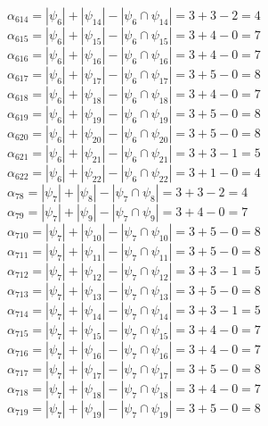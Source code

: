 \documentclass[a4paper,12pt]{article}
\begin{document}
$\alpha_{614} = |\psi_{6}| + |\psi_{14}| - |\psi_{6} \cap \psi_{14}| = 3 + 3 - 2 = 4$\\
$\alpha_{615} = |\psi_{6}| + |\psi_{15}| - |\psi_{6} \cap \psi_{15}| = 3 + 4 - 0 = 7$\\
$\alpha_{616} = |\psi_{6}| + |\psi_{16}| - |\psi_{6} \cap \psi_{16}| = 3 + 4 - 0 = 7$\\
$\alpha_{617} = |\psi_{6}| + |\psi_{17}| - |\psi_{6} \cap \psi_{17}| = 3 + 5 - 0 = 8$\\
$\alpha_{618} = |\psi_{6}| + |\psi_{18}| - |\psi_{6} \cap \psi_{18}| = 3 + 4 - 0 = 7$\\
$\alpha_{619} = |\psi_{6}| + |\psi_{19}| - |\psi_{6} \cap \psi_{19}| = 3 + 5 - 0 = 8$\\
$\alpha_{620} = |\psi_{6}| + |\psi_{20}| - |\psi_{6} \cap \psi_{20}| = 3 + 5 - 0 = 8$\\
$\alpha_{621} = |\psi_{6}| + |\psi_{21}| - |\psi_{6} \cap \psi_{21}| = 3 + 3 - 1 = 5$\\
$\alpha_{622} = |\psi_{6}| + |\psi_{22}| - |\psi_{6} \cap \psi_{22}| = 3 + 1 - 0 = 4$\\
$\alpha_{78} = |\psi_{7}| + |\psi_{8}| - |\psi_{7} \cap \psi_{8}| = 3 + 3 - 2 = 4$\\
$\alpha_{79} = |\psi_{7}| + |\psi_{9}| - |\psi_{7} \cap \psi_{9}| = 3 + 4 - 0 = 7$\\
$\alpha_{710} = |\psi_{7}| + |\psi_{10}| - |\psi_{7} \cap \psi_{10}| = 3 + 5 - 0 = 8$\\
$\alpha_{711} = |\psi_{7}| + |\psi_{11}| - |\psi_{7} \cap \psi_{11}| = 3 + 5 - 0 = 8$\\
$\alpha_{712} = |\psi_{7}| + |\psi_{12}| - |\psi_{7} \cap \psi_{12}| = 3 + 3 - 1 = 5$\\
$\alpha_{713} = |\psi_{7}| + |\psi_{13}| - |\psi_{7} \cap \psi_{13}| = 3 + 5 - 0 = 8$\\
$\alpha_{714} = |\psi_{7}| + |\psi_{14}| - |\psi_{7} \cap \psi_{14}| = 3 + 3 - 1 = 5$\\
$\alpha_{715} = |\psi_{7}| + |\psi_{15}| - |\psi_{7} \cap \psi_{15}| = 3 + 4 - 0 = 7$\\
$\alpha_{716} = |\psi_{7}| + |\psi_{16}| - |\psi_{7} \cap \psi_{16}| = 3 + 4 - 0 = 7$\\
$\alpha_{717} = |\psi_{7}| + |\psi_{17}| - |\psi_{7} \cap \psi_{17}| = 3 + 5 - 0 = 8$\\
$\alpha_{718} = |\psi_{7}| + |\psi_{18}| - |\psi_{7} \cap \psi_{18}| = 3 + 4 - 0 = 7$\\
$\alpha_{719} = |\psi_{7}| + |\psi_{19}| - |\psi_{7} \cap \psi_{19}| = 3 + 5 - 0 = 8$\\
\end{document}
